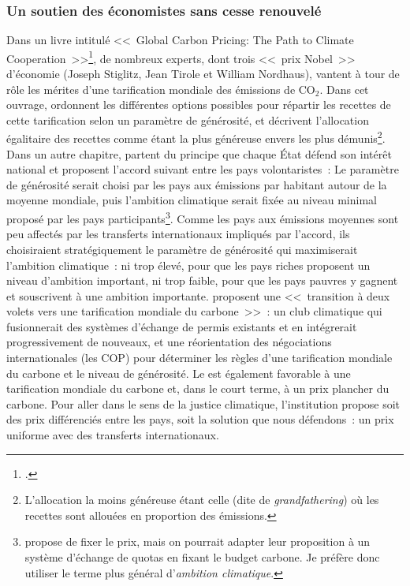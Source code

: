 \documentclass[a5paper,french,openany]{memoir}
\begin{document}
\subsubsection{Un soutien des économistes sans cesse renouvelé}
Dans un livre intitulé <<~Global Carbon Pricing: The Path to Climate Cooperation~>>\footnote{\citet{cramton_global_2017}.}, de nombreux experts, dont trois <<~prix Nobel~>> d'économie (Joseph Stiglitz, Jean Tirole et William Nordhaus), vantent à tour de rôle les mérites d'une tarification mondiale des émissions de CO$_\text{2}$. Dans cet ouvrage, \citet{gollier_negotiating_2015} ordonnent les différentes options possibles pour répartir les recettes de cette tarification selon un paramètre de générosité, et décrivent l'allocation égalitaire des recettes comme étant la plus généreuse envers les plus démunis\footnote{L'allocation la moins généreuse étant celle (dite de \textit{grandfathering}) où les recettes sont allouées en proportion des émissions.}. 
Dans un autre chapitre, \citet{cramton_international_2015} partent du principe que chaque État défend son intérêt national et proposent l'accord suivant entre les pays %
volontaristes~: Le paramètre de générosité serait choisi par les pays aux émissions par habitant autour de la moyenne mondiale, puis l'ambition climatique serait fixée au niveau minimal proposé par les pays participants\footnote{\citet{cramton_international_2015} propose de fixer le prix, mais on pourrait adapter leur proposition à un système d'échange de quotas en fixant le budget carbone. Je préfère donc utiliser le terme plus général d'\textit{ambition climatique}.}. Comme les pays aux émissions moyennes sont peu affectés par les transferts internationaux impliqués par l'accord, ils choisiraient stratégiquement le paramètre de générosité qui maximiserait l'ambition climatique~: ni trop élevé, pour que les pays riches proposent un niveau d'ambition important, ni trop faible, pour que les pays pauvres y gagnent et souscrivent à une ambition importante. \citet{van_den_berg_implications_2020} proposent une <<~transition à deux volets vers une tarification mondiale du carbone~>>~: un club climatique qui fusionnerait des systèmes d'échange de permis existants et en intégrerait progressivement de nouveaux, et une réorientation des négociations internationales (les COP) pour déterminer les règles d'une tarification mondiale du carbone et le niveau de générosité. Le \citet{fmi_how_2019} est également favorable à une tarification mondiale du carbone et, dans le court terme, à un prix plancher du carbone. Pour aller dans le sens de la justice climatique, l'institution propose soit des prix différenciés entre les pays, soit la solution que nous défendons~: un prix uniforme avec des transferts internationaux. 
\end{document}
